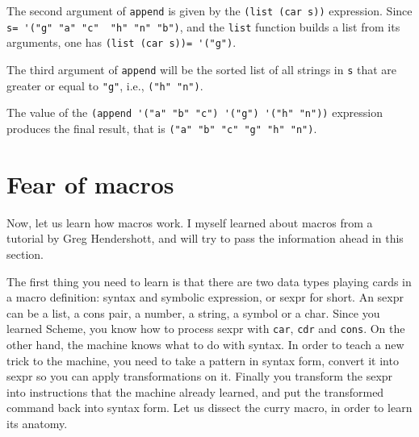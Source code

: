 \documentclass[a4paper,12pt]{book}
\begin{document}
The second argument of \verb|append| is
given by the \verb|(list (car s))| expression.
Since \verb|s= '("g" "a" "c"  "h" "n" "b")|,
and the \verb|list| function builds a list
from its arguments, one
has \verb|(list (car s))= '("g")|.

The third argument of \verb|append| will
be the sorted list of all strings in \verb|s|
that are greater or equal to \verb|"g"|,
i.e., \verb|("h" "n")|.

The value of the \verb|(append '("a" "b" "c") '("g") '("h" "n"))|
expression produces the final result, that is
\verb|("a" "b" "c" "g" "h" "n")|.

\section{Fear of macros}
Now, let us learn how macros work. I myself learned
about macros from a tutorial by Greg Hendershott, and
will try to pass the information ahead in this section.

The first thing you need to learn is that there are
two data types playing cards in a macro definition:
syntax and symbolic expression, or sexpr for short.
An sexpr can be a list, a cons pair, a number, a string,
a symbol or a char. Since you learned Scheme, you know
how to process sexpr with \verb|car|, \verb|cdr| and
\verb|cons|. On the other hand, the machine knows what
to do with syntax.  In order to teach a new trick to the
machine, you need to take a pattern in syntax form, convert
it into sexpr so you can apply transformations on it.
Finally you transform the sexpr into instructions
that the machine already learned, and put the transformed
command back into syntax form. Let us dissect the curry
macro, in order to learn its anatomy.
\end{document}

